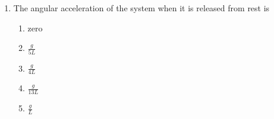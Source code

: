 \documentclass{../../../oss-apphys}
\begin{document}
\begin{multicols}{2}
\begin{enumerate}[leftmargin=18pt]
  \item The angular acceleration of the system when it is released from rest is
    \begin{enumerate}[noitemsep,topsep=0pt,leftmargin=18pt,label=(\Alph*)]
    \item zero
    \item $\displaystyle\frac{g}{5L}$
    \item $\displaystyle\frac{g}{4L}$
    \item $\displaystyle\frac{g}{13L}$
    \item  $\displaystyle\frac{g}{L}$
    \end{enumerate}
    \columnbreak
    
%  
%

\end{enumerate}
\end{multicols}
\end{document}
